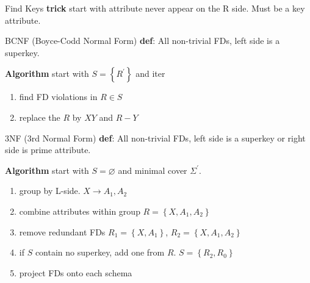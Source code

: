 \documentclass[a4paper]{article}
\begin{document}
\begin{multicols}{3}
\begin{cheatsheetblock}{Find Keys}
    \textbf{trick}
    start with attribute never appear on the R side. Must be a key attribute.
\end{cheatsheetblock}

\begin{cheatsheetblock}{BCNF (Boyce-Codd Normal Form)}
    \textbf{def}: All non-trivial FDs, left side is a superkey.

    \textbf{Algorithm} start with $S = \left\{R^\prime\right\}$ and iter
    \begin{enumerate}
        \item find FD violations in $R \in S$
        \item replace the $R$ by $XY$ and $R-Y$
    \end{enumerate}
\end{cheatsheetblock}

\begin{cheatsheetblock}{3NF (3rd Normal Form)}
    \textbf{def}: All non-trivial FDs, left side is a superkey or right side is prime attribute.

    \textbf{Algorithm} start with $S = \varnothing$ and minimal cover $\Sigma^\prime$.
    \begin{enumerate}
        \item group by L-side. \hfill $X \rightarrow A_1, A_2$
        \item combine attributes within group \hfill $R = \left\{X, A_1, A_2\right\}$
        \item remove redundant FDs \hfill \sout{$R_1 = \left\{X, A_1\right\}$}, $R_2 = \left\{X, A_1, A_2\right\}$
        \item if $S$ contain no superkey, add one from $R$. \hfill $S = \left\{R_2, R_0\right\}$
        \item project FDs onto each schema
    \end{enumerate}
\end{cheatsheetblock}


\end{multicols}
\end{document}
